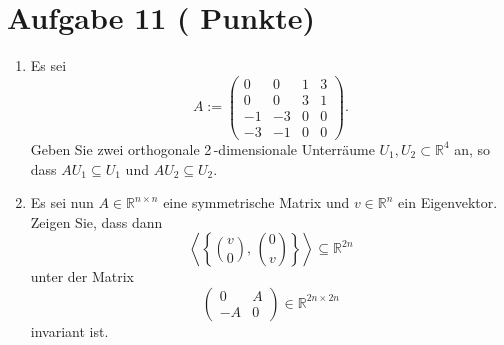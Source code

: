 \documentclass[11pt, a4paper]{article}
\newcommand{\aufgabe}[2]{%
  \section*{\Large\bfseries Aufgabe #1%
  \if\relax\detokenize{#2}\relax\else \hfill\normalfont\normalsize(#2 Punkte)\fi}%
  \vspace{-1.5ex}
}
\begin{document}
\aufgabe{11}{}
\begin{enumerate}
  \item Es sei
  \[
    A:=
    \begin{pmatrix}
      0 & 0 & 1 & 3\\
      0 & 0 & 3 & 1\\
     -1 & -3 & 0 & 0\\
     -3 & -1 & 0 & 0
    \end{pmatrix}.
  \]
  Geben Sie zwei orthogonale 2\,-dimensionale Unterräume $U_1,U_2\subset \mathbb{R}^4$ an, so dass $AU_1\subseteq U_1$ und $AU_2\subseteq U_2$.
  \begin{framed}\end{framed}

  \item Es sei nun $A\in\mathbb{R}^{n\times n}$ eine symmetrische Matrix und $v\in\mathbb{R}^n$ ein Eigenvektor. Zeigen Sie, dass dann
  \[
    \left\langle \left\{ \binom{v}{0},\,\binom{0}{v} \right\} \right\rangle \subseteq \mathbb{R}^{2n}
  \]
  unter der Matrix
  \[
    \begin{pmatrix}
      0 & A\\
      -A & 0
    \end{pmatrix}\in\mathbb{R}^{2n\times 2n}
  \]
  invariant ist.
  \begin{framed}\end{framed}
\end{enumerate}

\vspace{0.5em}
\end{document}
